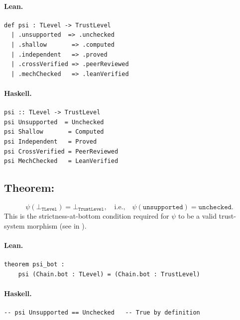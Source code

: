 \documentclass[11pt,a4paper]{article}
\begin{document}
\paragraph{Lean.}
\begin{lstlisting}[style=lean]
def psi : TLevel -> TrustLevel
  | .unsupported  => .unchecked
  | .shallow       => .computed
  | .independent   => .proved
  | .crossVerified => .peerReviewed
  | .mechChecked   => .leanVerified
\end{lstlisting}

\paragraph{Haskell.}
\begin{lstlisting}[style=haskell]
psi :: TLevel -> TrustLevel
psi Unsupported  = Unchecked
psi Shallow       = Computed
psi Independent   = Proved
psi CrossVerified = PeerReviewed
psi MechChecked   = LeanVerified
\end{lstlisting}


\subsection{Theorem: }

\begin{thm}
\[
  \psi(\bot_{\mathtt{TLevel}}) = \bot_{\mathtt{TrustLevel}},
  \quad\text{i.e.,}\quad
  \psi(\mathtt{unsupported}) = \mathtt{unchecked}.
\]
This is the strictness-at-bottom condition required for $\psi$ to be a valid
trust-system morphism (see  in ).
\end{thm}

\paragraph{Lean.}
\begin{lstlisting}[style=lean]
theorem psi_bot :
    psi (Chain.bot : TLevel) = (Chain.bot : TrustLevel)
\end{lstlisting}

\paragraph{Haskell.}
\begin{lstlisting}[style=haskell]
-- psi Unsupported == Unchecked   -- True by definition
\end{lstlisting}
\end{document}
